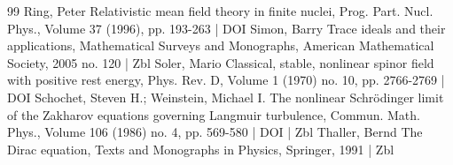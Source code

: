 \documentclass[10pt]{amsart}
\theoremstyle{definition}\newtheorem{defi}[theo]{Definition}\newtheorem{rema}[theo]{Remark}\newtheorem{exam}[theo]{Example}\newtheorem{exem}[theo]{Example}\newtheorem{nota}[theo]{Notation}
\begin{document}
\begin{thebibliography}{99}
Ring, Peter Relativistic mean field theory in finite nuclei, Prog. Part. Nucl. Phys., Volume 37 (1996), pp. 193-263 | DOI
Simon, Barry Trace ideals and their applications, Mathematical Surveys and Monographs, American Mathematical Society, 2005 no. 120 | Zbl
Soler, Mario Classical, stable, nonlinear spinor field with positive rest energy, Phys. Rev. D, Volume 1 (1970) no. 10, pp. 2766-2769 | DOI
Schochet, Steven H.; Weinstein, Michael I. The nonlinear Schrödinger limit of the Zakharov equations governing Langmuir turbulence, Commun. Math. Phys., Volume 106 (1986) no. 4, pp. 569-580 | DOI | Zbl
Thaller, Bernd The Dirac equation, Texts and Monographs in Physics, Springer, 1991 | Zbl
\end{thebibliography}
\end{document}
